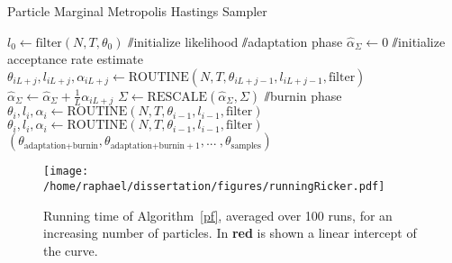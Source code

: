 \documentclass[12pt]{article}
\begin{document}
	\begin{algorithm}
		\caption{Particle Marginal Metropolis Hastings Sampler}\label{pmmh}
		\begin{algorithmic}[1]
			\State $l_0 \gets \text{filter}(N, T, \theta_0)$ $\sslash$initialize likelihood
			 $\sslash$adaptation phase
			\State $\hat{\alpha}_\Sigma \gets 0$ $\sslash$initialize acceptance rate estimate
			\State $\theta_{iL+j}, l_{iL+j}, \alpha_{iL+j} \gets \text{ROUTINE}(N, T, \theta_{iL+j-1}, l_{iL+j-1}, \text{filter})$
			\State $\hat{\alpha}_\Sigma \gets \hat{\alpha}_\Sigma + \frac{1}{L}\alpha_{iL+j}$
			\EndFor
			\State $\Sigma \gets \text{RESCALE}(\hat{\alpha}_\Sigma, \Sigma)$
			\EndFor
			$\sslash$burnin phase
			\State $\theta_i, l_i, \alpha_i \gets \text{ROUTINE}(N, T, \theta_{i-1}, l_{i-1}, \text{filter})$
			\EndFor
			\State $\theta_i, l_i, \alpha_i \gets \text{ROUTINE}(N, T, \theta_{i-1}, l_{i-1}, \text{filter})$
			\EndFor
			\Return $(\theta_{\text{adaptation+burnin}},\theta_{\text{adaptation+burnin}+1}, \text{...}\ , \theta_{\text{samples}})$
			\EndFunction
		\end{algorithmic}
	\end{algorithm}

	\begin{figure}[htb]
		\centering
		\begin{minipage}{0.9\textwidth}
			\centering
			\texttt{[image: /home/raphael/dissertation/figures/runningRicker.pdf]}
		\end{minipage}
		\caption[Running time of the particle filter used on the Ricker model.]{Running time of Algorithm~\ref{pf}, averaged over 100 runs, for an increasing number of particles. In \textbf{red} is shown a linear intercept of the curve.}
		\label{fig:runningRicker}
	\end{figure}
	
\end{document}
